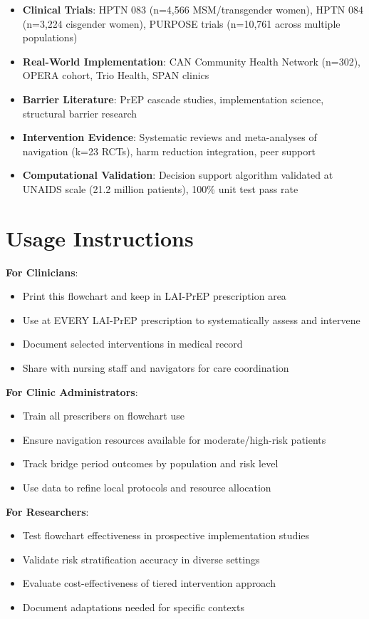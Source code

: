 \documentclass[11pt]{article}
\begin{document}
\begin{itemize}
\item \textbf{Clinical Trials}: HPTN 083 (n=4,566 MSM/transgender women), HPTN 084 (n=3,224 cisgender women), PURPOSE trials (n=10,761 across multiple populations)
\item \textbf{Real-World Implementation}: CAN Community Health Network (n=302), OPERA cohort, Trio Health, SPAN clinics
\item \textbf{Barrier Literature}: PrEP cascade studies, implementation science, structural barrier research
\item \textbf{Intervention Evidence}: Systematic reviews and meta-analyses of navigation (k=23 RCTs), harm reduction integration, peer support
\item \textbf{Computational Validation}: Decision support algorithm validated at UNAIDS scale (21.2 million patients), 100\% unit test pass rate
\end{itemize}

\section*{Usage Instructions}

\textbf{For Clinicians}:
\begin{itemize}
\item Print this flowchart and keep in LAI-PrEP prescription area
\item Use at EVERY LAI-PrEP prescription to systematically assess and intervene
\item Document selected interventions in medical record
\item Share with nursing staff and navigators for care coordination
\end{itemize}

\textbf{For Clinic Administrators}:
\begin{itemize}
\item Train all prescribers on flowchart use
\item Ensure navigation resources available for moderate/high-risk patients
\item Track bridge period outcomes by population and risk level
\item Use data to refine local protocols and resource allocation
\end{itemize}

\textbf{For Researchers}:
\begin{itemize}
\item Test flowchart effectiveness in prospective implementation studies
\item Validate risk stratification accuracy in diverse settings
\item Evaluate cost-effectiveness of tiered intervention approach
\item Document adaptations needed for specific contexts
\end{itemize}
\end{document}
